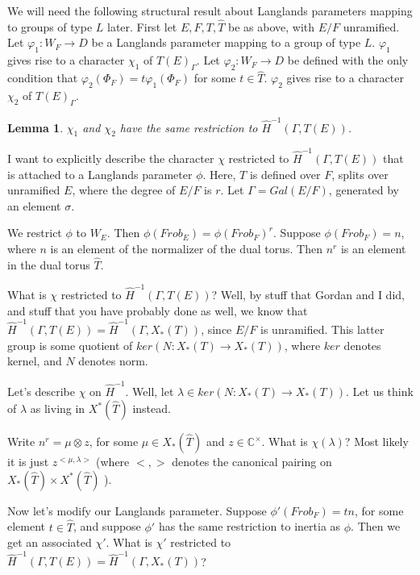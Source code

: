 \documentclass[11pt]{amsart}
\theoremstyle{plain}
\newtheorem{lemma}[theorem]{Lemma}
\theoremstyle{definition}
\begin{document}
We will need the following structural result about Langlands
parameters mapping to groups of type $L$ later.  First let $E,F,T,\hat{T}$
be as above, with $E/F$ unramified.  Let $\varphi_1 : W_F \rightarrow D$
be a Langlands parameter mapping to a group of type $L$.  $\varphi_1$
gives rise to a character $\chi_1$ of $T(E)_{\Gamma}$.  Let $\varphi_2
: W_F \rightarrow D$ be defined with the only condition that
$\varphi_2(\Phi_F) = t \varphi_1(\Phi_F)$ for some $t \in \hat{T}$.
$\varphi_2$ gives rise to a character $\chi_2$ of $T(E)_{\Gamma}$.

\begin{lemma}\label{toralmodification}
$\chi_1$ and $\chi_2$ have the same restriction to $\hat{H}^{-1}(\Gamma, T(E))$.
\end{lemma}

\proof
I want to explicitly describe the character $\chi$ restricted to
$\hat{H}^{-1}(\Gamma, T(E))$ that is attached to a Langlands parameter
$\phi$.  Here, $T$ is defined over $F$, splits over unramified $E$,
where the degree of $E/F$ is $r$.  Let $\Gamma = Gal(E/F)$, generated
by an element $\sigma$.

We restrict $\phi$ to $W_E$.  Then $\phi(Frob_E) = \phi(Frob_F)^r$.
Suppose $\phi(Frob_F) = n$, where $n$ is an element of the normalizer
of the dual torus.  Then $n^r$ is an element in the dual torus
$\hat{T}$.

What is $\chi$ restricted to $\hat{H}^{-1}(\Gamma, T(E))$?  Well, by
stuff that Gordan and I did, and stuff that you have probably done as
well, we know that $\hat{H}^{-1}(\Gamma, T(E)) = \hat{H}^{-1}(\Gamma, X_*(T))$,
since $E/F$ is unramified.  This latter group is some quotient of
$ker(N : X_*(T) \rightarrow X_*(T))$, where $ker$ denotes kernel, and
$N$ denotes norm.

Let's describe $\chi$ on $\hat{H}^{-1}$.  Well, let
$\lambda \in ker(N : X_*(T) \rightarrow X_*(T))$.  Let us think of
$\lambda$ as living in $X^*(\hat{T})$ instead.

Write $n^r = \mu \otimes z$, for some $\mu \in X_*(\hat{T})$ and
$z \in \mathbb{C}^\times$.  What is $\chi(\lambda)$?  Most likely it is
just $z^{<\mu, \lambda>}$ (where $< , >$ denotes the canonical pairing
on $X_*(\hat{T}) \times X^*(\hat{T})$ ).

Now let's modify our Langlands parameter.  Suppose
$\phi'(Frob_F) = tn$, for some element $t \in \hat{T}$, and suppose
$\phi'$ has the same restriction to inertia as $\phi$.  Then we get an
associated $\chi'$.  What is $\chi'$ restricted to
$\hat{H}^{-1}(\Gamma, T(E)) = \hat{H}^{-1}(\Gamma, X_*(T))$?
\end{document}
